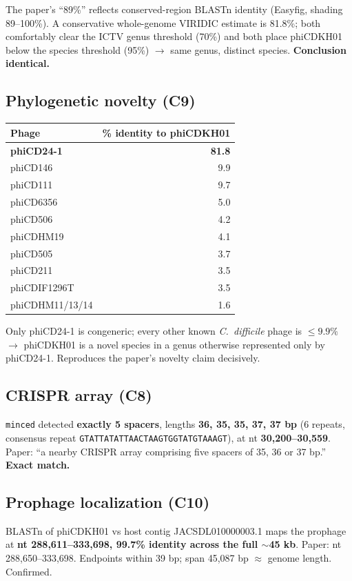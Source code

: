\documentclass[11pt]{article}
\begin{document}
The paper's ``89\%'' reflects conserved-region BLASTn identity (Easyfig,
shading 89--100\%). A conservative whole-genome VIRIDIC estimate is 81.8\%;
both comfortably clear the ICTV genus threshold (70\%) and both place
phiCDKH01 below the species threshold (95\%) $\to$ same genus, distinct
species. \textbf{Conclusion identical.}

\subsection{Phylogenetic novelty (C9)}
\begin{center}\begin{tabular}{lr}
\toprule
Phage & \% identity to phiCDKH01 \\
\midrule
\textbf{phiCD24-1} & \textbf{81.8} \\
phiCD146           & 9.9 \\
phiCD111           & 9.7 \\
phiCD6356          & 5.0 \\
phiCD506           & 4.2 \\
phiCDHM19          & 4.1 \\
phiCD505           & 3.7 \\
phiCD211           & 3.5 \\
phiCDIF1296T       & 3.5 \\
phiCDHM11/13/14    & 1.6 \\
\bottomrule
\end{tabular}\end{center}

Only phiCD24-1 is congeneric; every other known \emph{C.\ difficile} phage is
$\leq 9.9\%$ $\to$ phiCDKH01 is a novel species in a genus otherwise
represented only by phiCD24-1. Reproduces the paper's novelty claim decisively.

\subsection{CRISPR array (C8)}
\texttt{minced} detected \textbf{exactly 5 spacers}, lengths
\textbf{36, 35, 35, 37, 37 bp} (6 repeats, consensus repeat
\texttt{GTATTATATTAACTAAGTGGTATGTAAAGT}), at nt \textbf{30{,}200--30{,}559}.
Paper: ``a nearby CRISPR array comprising five spacers of 35, 36 or 37 bp.''
\textbf{Exact match.}

\subsection{Prophage localization (C10)}
BLASTn of phiCDKH01 vs host contig JACSDL010000003.1 maps the prophage at
\textbf{nt 288{,}611--333{,}698, 99.7\% identity across the full $\sim$45 kb}.
Paper: nt 288{,}650--333{,}698. Endpoints within 39 bp; span 45{,}087 bp
$\approx$ genome length. Confirmed.
\end{document}
